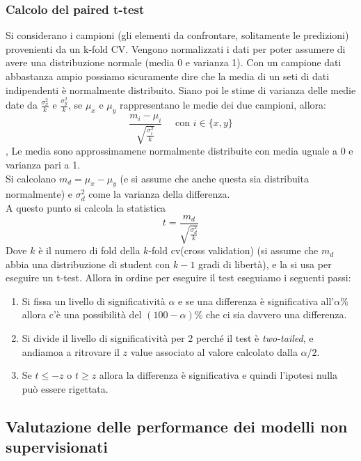 \subsubsection{Calcolo del paired t-test}
Si considerano i campioni (gli elementi da confrontare, solitamente le predizioni) provenienti da un k-fold CV. Vengono normalizzati i dati per poter assumere di avere una distribuzione normale (media 0 e varianza 1). Con un campione dati abbastanza ampio possiamo sicuramente dire che la media di un seti di dati indipendenti è normalmente distribuito. Siano poi le stime di varianza delle medie date da $\frac{\sigma_x^2}{k}$ e $\frac{\sigma_y^2}{k}$, se $\mu_x$ e $\mu_y$ rappresentano le medie dei due campioni, allora: 
\[\displaystyle \frac{m_i - \mu_i} {\sqrt{\displaystyle \frac{\sigma_i^2}{k}}} \quad \mbox{ con } i \in \{x,y\}\],
Le media sono approssimamene normalmente distribuite con media uguale a 0 e varianza pari a 1.\\

Si calcolano $m_d = \mu_x - \mu_y$ (e si assume che anche questa sia distribuita normalmente) e $\sigma_d^2$ come la varianza della differenza. \\
A questo punto si calcola la statistica \[t = \displaystyle \frac{m_d}{\sqrt{\displaystyle \frac{\sigma_d^2}{k}}}\]
Dove $k$ è il numero di fold della $k$-fold cv(cross validation) (si assume che $m_d$ abbia una distribuzione di student con $k-1$ gradi di libertà), e la si usa per eseguire un t-test. Allora in ordine per eseguire il test eseguiamo i seguenti passi:
\begin{enumerate}
    \item Si fissa un livello di significatività $\alpha$ e se una differenza è significativa all’$\alpha\%$ allora c’è una possibilità del $(100-\alpha)\%$ che ci sia davvero una differenza.
    \item Si divide il livello di significatività per 2 perché il test è \textit{two-tailed}, e andiamoa a ritrovare il $z$ value associato al valore calcolato dalla $\alpha/2$.
    \item Se $t \leq -z$ o $t \geq z$ allora la differenza è significativa e quindi l’ipotesi nulla può essere rigettata.
\end{enumerate}

\subsection{Valutazione delle performance dei modelli non supervisionati}

